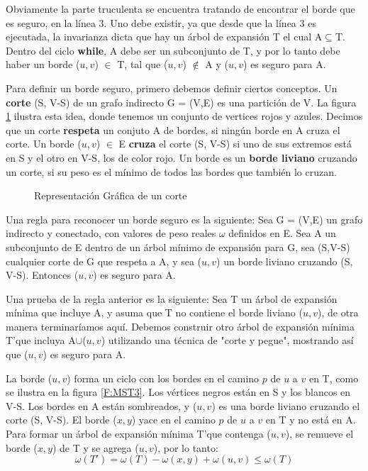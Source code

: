 \documentclass[a4paper, 11pt]{report}
\newcommand{\DrawEJcGraph}[5]{

    \begin{scope}[#5]
    \foreach \pos/\nodo in {{(0,0)/4}, {(0,1.2)/5}, {(1,1)/7}, {(2,2.2)/1}, {(2,0.6)/0}, {(3.4,0.9)/2}, {(3.4,2.2)/3}, {(5,0)/6}}
        \node[vertex] (#3\nodo) at \pos {\nodo};
    \foreach \start/\end in {4/5, 5/7, 7/1,7/0,0/2,2/3,2/6,4/7,1/5,0/4,1/2,1/3,2/7,3/6,6/0,6/4}
        \path[edge,#5] (#3\start) -- (#3\end);

    \foreach \nodo in {#1}
        \node[selected vertex] at (#3\nodo) {\nodo};

    \begin{pgfonlayer}{background}%
        \foreach \start/\end in {#2}
            \path[rojod edge,#5] (#3\start) -- (#3\end);
    \end{pgfonlayer}
    \begin{pgfonlayer}{background}%
        \foreach \start/\end in {#3}
            \path[rojog edge,#5] (#3\start) -- (#3\end);
    \end{pgfonlayer}
    \begin{pgfonlayer}{background}%
        \foreach \start/\end in {#4}
            \path[azul edge,#5] (#3\start) -- (#3\end);
    \end{pgfonlayer}
    \end{scope}

}
\begin{document}
Obviamente la parte truculenta se encuentra tratando de encontrar el borde que es seguro, en la línea 3. Uno debe existir, ya que desde que la línea 3 es ejecutada, la invarianza dicta que hay un árbol de expansión T el cual A$ \subseteq $T. Dentro del ciclo \textbf{while}, A debe ser un subconjunto de T, y por lo tanto debe haber un borde ($u,v$) $ \in $ T, tal que ($u, v$) $\notin$ A y ($u, v$) es seguro para A.

Para definir un borde seguro, primero debemos definir ciertos conceptos. Un \textbf{corte} (S, V-S) de un grafo indirecto G = (V,E) es una partición de V. La figura \ref{MST2} ilustra esta idea, donde tenemos un conjunto de vertices rojos y azules. Decimos que un corte \textbf{respeta} un conjuto A de bordes, si ningún borde en A cruza el corte. Un borde ($u,v$) $\in$ E \textbf{cruza} el corte (S, V-S) si uno de sus extremos está en S y el otro en V-S, los de color rojo. Un borde es un \textbf{borde liviano} cruzando un corte, si su peso es el mínimo de todos las bordes que también lo cruzan.

\begin{figure}[!h]
    \centering
    \caption{Representaci\'on Gr\'afica de un corte}
    \label{MST2}
\end{figure}

Una regla para reconocer un borde seguro es la siguiente: Sea G = (V,E) un grafo indirecto y conectado, con valores de peso reales $\omega$ definidos en E. Sea A un subconjunto de E dentro de un árbol mínimo de expansión para G, sea (S,V-S) cualquier corte de G que respeta a A, y sea ($u, v$) un borde liviano cruzando (S, V-S). Entonces ($u, v$) es seguro para A.

Una prueba de la regla anterior es la siguiente:
Sea T un árbol de expansión mínima que incluye A, y asuma que T no contiene el borde liviano ($u,v$), de otra manera terminaríamos aquí. Debemos construir otro árbol de expansión mínima T'que incluya A$\cup${($u,v$)} utilizando una técnica de "corte y pegue", mostrando así que ($u,v$) es seguro para A.

La borde ($u, v$) forma un ciclo con los bordes en el camino $p$ de $u$ a $v$ en T, como se ilustra en la figura \ref{F:MST3}. Los vértices negros están en S y los blancos en V-S. Los bordes en A están sombreados, y ($u, v$) es una borde liviano cruzando el corte (S, V-S). El borde ($x, y$) yace en el camino $p$ de $u$ a $v$ en T y no está en A. Para formar un árbol de expansión mínima T'que contenga ($u, v$), se remueve el borde ($x, y$) de T y se agrega ($u, v$), por lo tanto:
\begin{equation}
\omega(T') = \omega(T) - \omega(x,y) + \omega(u,v)\leq \omega(T) 
\end{equation}
\end{document}
